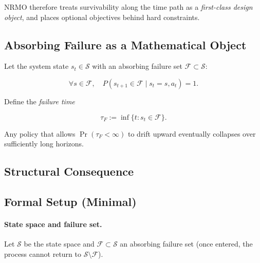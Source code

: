 NRMO therefore treats survivability along the time path as a
\emph{first-class design object}, and places optional objectives
behind hard constraints.

\subsection{Absorbing Failure as a Mathematical Object}
\label{sec:foundations-2-2-absorbing-failure}

Let the system state $s_t \in \mathcal{S}$ with an absorbing failure
set $\mathcal{F} \subset \mathcal{S}$:

\begin{equation}
\forall s \in \mathcal{F}, \quad
P(s_{t+1} \in \mathcal{F} \mid s_t = s, a_t) = 1.
\label{eq:foundations-absorbing-set}
\end{equation}

Define the \emph{failure time}

\begin{equation}
\tau_F := \inf\{t : s_t \in \mathcal{F}\}.
\label{eq:foundations-failure-time}
\end{equation}

Any policy that allows $\Pr(\tau_F < \infty)$ to drift upward
eventually collapses over sufficiently long horizons.

\subsection{Structural Consequence}
\label{sec:foundations-2-3-structural-consequence}


\subsection{Formal Setup (Minimal)}
\label{sec:foundations-2-4-formal-setup}

\paragraph{State space and failure set.}
Let $\mathcal{S}$ be the state space and $\mathcal{F} \subset
\mathcal{S}$ an absorbing failure set (once entered, the process
cannot return to $\mathcal{S} \setminus \mathcal{F}$).

